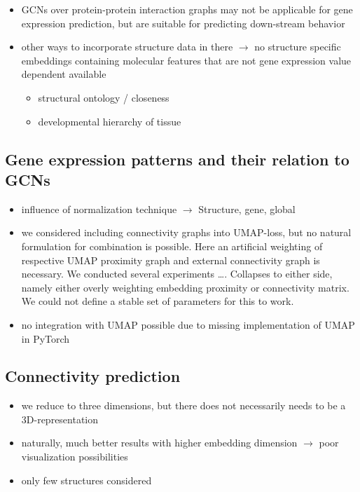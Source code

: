\documentclass[]{article}
\begin{document}
\begin{itemize}
	\item GCNs over protein-protein interaction graphs may not be applicable for gene expression prediction, but are suitable for predicting down-stream behavior 
	\item other ways to incorporate structure data in there $\rightarrow$ no structure specific embeddings containing molecular features that are not gene expression value dependent available
	\begin{itemize}
		\item structural ontology / closeness
		\item developmental hierarchy of tissue
	\end{itemize}
\end{itemize}

\subsection{Gene expression patterns and their relation to GCNs}

\begin{itemize}
	\item influence of normalization technique $\rightarrow$ Structure, gene, global
	\item we considered including connectivity graphs into UMAP-loss, but no natural formulation for combination is possible. Here an artificial weighting of respective UMAP proximity graph and external connectivity graph is necessary. We conducted several experiments \dots. Collapses to either side, namely either overly weighting embedding proximity or connectivity matrix. We could not define a stable set of parameters for this to work. 
	\item no integration with UMAP possible due to missing implementation of UMAP in PyTorch
\end{itemize}

\subsection{Connectivity prediction}

\begin{itemize}
	\item we reduce to three dimensions, but there does not necessarily needs to be a 3D-representation
	\item naturally, much better results with higher embedding dimension $\rightarrow$ poor visualization possibilities
	\item only few structures considered
\end{itemize}
\end{document}

